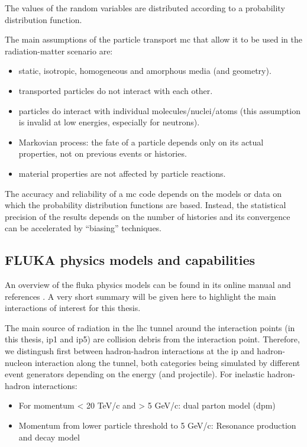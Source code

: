 \documentclass[encoding=utf8,british]{tumphthesis}
\begin{document}
The values of the random variables are  distributed according to a probability distribution function.

The main assumptions of the particle transport \acrshort{mc} that allow it to be used in the radiation-matter scenario are:
\begin{itemize}
    \item static, isotropic, homogeneous and amorphous media (and geometry).
    \item transported particles do not interact with each other.
    \item particles do interact with individual molecules/nuclei/atoms (this assumption is invalid at low energies, especially for neutrons).
    \item Markovian process: the fate of a particle depends only on its actual properties, not on previous events or histories.
    \item material properties are not affected by particle reactions.
\end{itemize}


The accuracy and reliability of a \acrshort{mc} code depends on the models or data on which the probability distribution functions are based. Instead, the statistical precision of the results depends on the number of histories and its convergence can be accelerated by “biasing” techniques.

\subsection{FLUKA physics models and capabilities}
An overview of the \acrshort{fluka} physics models can be found in its online manual and references \cite{b4}. A very short summary will be given here to highlight the main interactions of interest for this thesis.

The main source of radiation in the \acrshort{lhc} tunnel around the interaction points (in this thesis, \acrshort{ip}1 and \acrshort{ip}5) are collision debris from the interaction point. Therefore, we distingush first between hadron-hadron interactions at the \acrshort{ip} and hadron-nucleon interaction along the tunnel, both categories being simulated by different event generators depending on the energy (and projectile). For inelastic hadron-hadron interactions:
\begin{itemize}
    \item For momentum < 20 TeV/c and > 5 GeV/c: dual parton model (\acrshort{dpm}) \cite{Capella:1992yb}
    \item Momentum from lower particle threshold to 5 GeV/c: Resonance production and decay model \cite{Fer96b}
\end{itemize}
\end{document}
